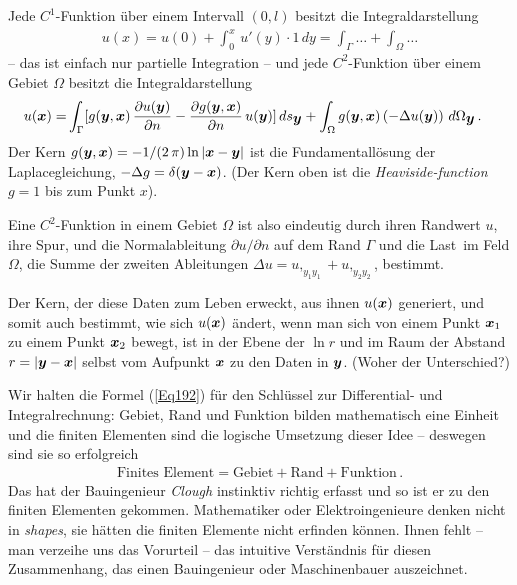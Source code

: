 {{{{{{Jede $C^1$-Funktion \"{u}ber einem Intervall $(0,l) $ besitzt die Integraldarstellung
\begin{align}
u(x) = u(0) + \int_{0}^{x}\,u'(y)\cdot 1\,dy = \int_{\Gamma} \ldots + \int_{\Omega} \ldots
\end{align}
-- das ist einfach nur partielle Integration -- und jede $C^2$-Funktion \"{u}ber einem Gebiet $\Omega$ besitzt die Integraldarstellung
\begin{align} \label{Eq192}
u(\mbox{\boldmath $x$}) = &\int_{\Gamma} [g(\mbox{\boldmath $y$}, \mbox{\boldmath $x$}) \,\frac{\partial u(\mbox{\boldmath $y$})}{\partial n} - \frac{\partial g(\mbox{\boldmath $y$}, \mbox{\boldmath $x$})}{\partial n}\,u(\mbox{\boldmath $y$})]\,ds_{\mbox{\boldmath $y$}} + \int_{\Omega} g(\mbox{\boldmath $y$}, \mbox{\boldmath $x$})\,(- \Delta u(\mbox{\boldmath $y$}))\,\,d\Omega_{\mbox{\boldmath $y$}}\,.
\end{align}
Der Kern $g(\mbox{\boldmath $y$}, \mbox{\boldmath $x$}) = -1/(2\,\pi) \ln |\mbox{\boldmath $x$} - \mbox{\boldmath $y$}|$ ist die Fundamentall\"{o}sung der Laplacegleichung, $- \Delta g = \delta(\mbox{\boldmath $y$} - \mbox{\boldmath $x$})$. (Der Kern oben ist die {\em Heaviside-function\/} $g = 1$ bis zum Punkt $x$).

Eine $C^2$-Funktion in einem Gebiet $\Omega $ ist also eindeutig durch ihren Randwert $u$, ihre \glq Spur\grq, und die Normalableitung $\partial u/\partial n$ auf dem Rand $\Gamma$ und die \glq Last\grq\ im Feld $\Omega$, die Summe der zweiten Ableitungen $\Delta u = u,_{y_1 y_1} + u,_{y_2 y_2}$, bestimmt.

Der Kern, der diese Daten zum Leben erweckt, aus ihnen $u(\mbox{\boldmath $x$})$ generiert, und somit auch bestimmt, wie sich $u(\mbox{\boldmath $x$})$ \"{a}ndert, wenn man sich von einem Punkt $\mbox{\boldmath $x$}_1$ zu einem Punkt $\mbox{\boldmath $x$}_2$ bewegt, ist in der Ebene der $\ln r$ und im Raum der Abstand $r = |\mbox{\boldmath $y$} - \mbox{\boldmath $x$}|$ selbst vom Aufpunkt $\mbox{\boldmath $x$}$ zu den Daten in $\mbox{\boldmath $y$}$. (Woher der Unterschied?)


Wir halten die Formel (\ref{Eq192}) f\"{u}r den Schl\"{u}ssel zur Diffe\-ren\-tial- und Integralrechnung: Gebiet, Rand und Funktion bilden mathematisch eine Einheit und die finiten Elementen sind die logische Umsetzung dieser Idee -- deswegen sind sie so erfolgreich
\begin{align}\label{Eq191}
\text{Finites Element} = \text{Gebiet} + \text{Rand} + \text{Funktion}\,.
\end{align}
Das hat der Bauingenieur {\em Clough\/} instinktiv richtig erfasst und so ist er zu den finiten Elementen gekommen. Mathematiker oder Elektroingenieure denken nicht in {\em shapes\/}, sie h\"{a}tten die finiten Elemente nicht erfinden k\"{o}nnen. Ihnen fehlt -- man verzeihe uns das Vorurteil -- das intuitive Verst\"{a}ndnis f\"{u}r diesen Zusammenhang, das einen Bauingenieur oder Maschinenbauer auszeichnet.

}}}}}}
